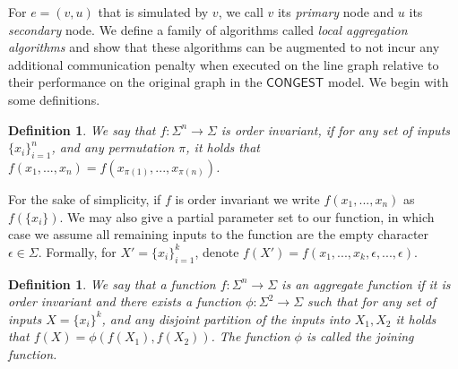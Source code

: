 \documentclass[11pt]{article}
\newtheorem{definition}[theorem]{Definition}
\begin{document}
For $e=(v,u)$ that is simulated by $v$, we call $v$ its \emph{primary} node and $u$ its \emph{secondary} node. We define a family of algorithms called \emph{local aggregation algorithms} and show that these algorithms can be augmented to not incur any additional communication penalty when executed on the line graph relative to their performance on the original graph in the $\mathsf{CONGEST}$ model. We begin with some definitions.


%	

\begin{definition}
	We say that $f:\Sigma^n \rightarrow \Sigma$ is \emph{order invariant}, if for any set of inputs $\{x_i\}^n_{i=1}$, and any permutation $\pi$, it holds that $f(x_1,..., x_n) = f(x_{\pi(1)},..., x_{\pi(n)})$.
\end{definition}
For the sake of simplicity, if $f$ is order invariant we write $f(x_1,..., x_n)$ as $f(\{x_i\})$.
We may also give a partial parameter set to our function, in which case we assume all remaining inputs to the function are the empty character $\epsilon \in \Sigma$. Formally, for $X'=\{x_i\}^k_{i=1}$, denote $f(X')=f(x_1,...,x_k,\epsilon,...,\epsilon)$.
\begin{definition}
	We say that a function $f:\Sigma^n \rightarrow \Sigma$ is an \emph{aggregate function} if it is order invariant and there exists a function $\phi:\Sigma^2 \rightarrow \Sigma$ such that for any set of inputs $X=\{x_i\}^k$, and any disjoint partition of the inputs into $X_1,X_2$ it holds that $f(X)= \phi(f(X_1), f(X_2))$. The function $\phi$ is called the \emph{joining function}.
\end{definition}
\end{document}

